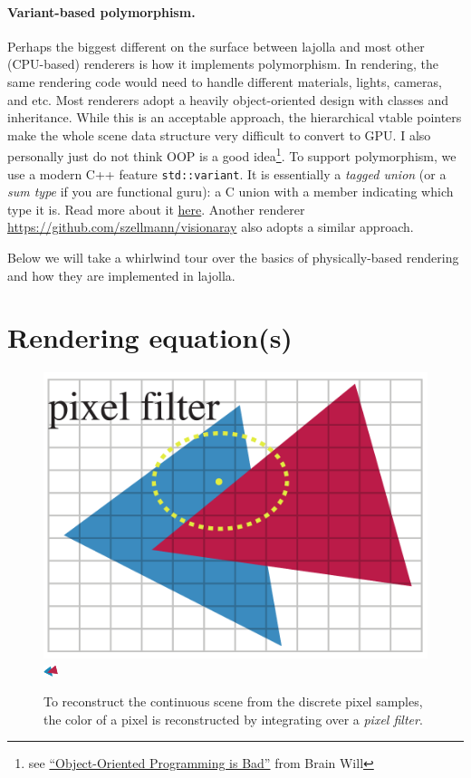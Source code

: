\documentclass{article}
\begin{document}
\paragraph{Variant-based polymorphism.} Perhaps the biggest different on the surface between lajolla and most other (CPU-based) renderers is how it implements polymorphism. In rendering, the same rendering code would need to handle different materials, lights, cameras, and etc. Most renderers adopt a heavily object-oriented design with classes and inheritance. While this is an acceptable approach, the hierarchical vtable pointers make the whole scene data structure very difficult to convert to GPU. I also personally just do not think OOP is a good idea\footnote{see \href{https://www.youtube.com/watch?v=QM1iUe6IofM}{``Object-Oriented Programming is Bad''} from Brain Will}. To support polymorphism, we use a modern C++ feature \lstinline{std::variant}. It is essentially a \emph{tagged union} (or a \emph{sum type} if you are functional guru): a C union with a member indicating which type it is. Read more about it \href{https://www.cppstories.com/2020/04/variant-virtual-polymorphism.html/}{here}. Another renderer \href{visionaray}{https://github.com/szellmann/visionaray} also adopts a similar approach.

Below we will take a whirlwind tour over the basics of physically-based rendering and how they are implemented in lajolla.

\section{Rendering equation(s)}
\begin{figure}[h]
    \centering
    \includegraphics[width=0.4\linewidth]{imgs/pixel_filter.pdf}
    \includegraphics[width=0.4\linewidth]{imgs/antialiasing.pdf}
    \caption{To reconstruct the continuous scene from the discrete pixel samples, the color of a pixel is reconstructed by integrating over a \emph{pixel filter}.}
    \label{fig:pixel_filter}
\end{figure}
\end{document}
